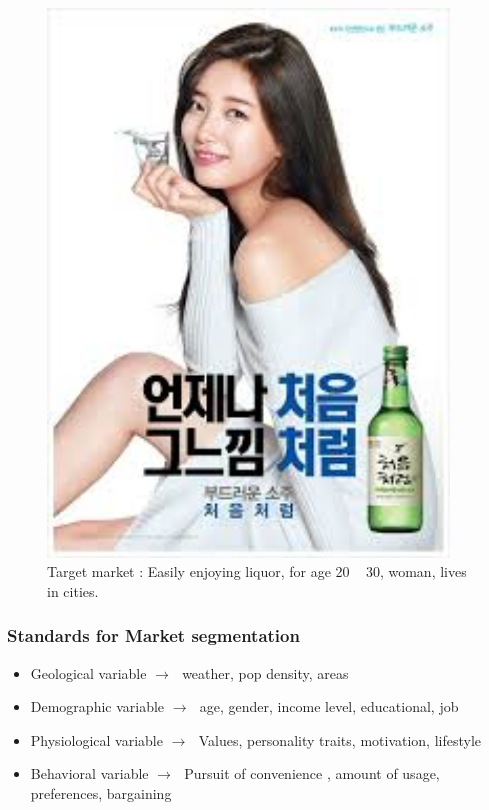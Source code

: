 \documentclass[12pt]{article}
\newcommand{\ra}{$\rightarrow \text{ }$}
\begin{document}
\begin{figure}[H]
	\centering
	\includegraphics[width=0.95\textwidth]{img/soju.png}
	\caption{Target market : Easily enjoying liquor, for age 20 ~ 30, woman, lives in cities.}
	\label{soju}
\end{figure}


\subsubsection{Standards for Market segmentation}

\begin{itemize}
	\item Geological variable \ra weather, pop density, areas
	\item Demographic variable \ra age, gender, income level, educational, job
	\item Physiological variable \ra Values, personality traits, motivation, lifestyle
	\item Behavioral variable \ra Pursuit of convenience , amount of usage, preferences, bargaining
\end{itemize}
\end{document}
